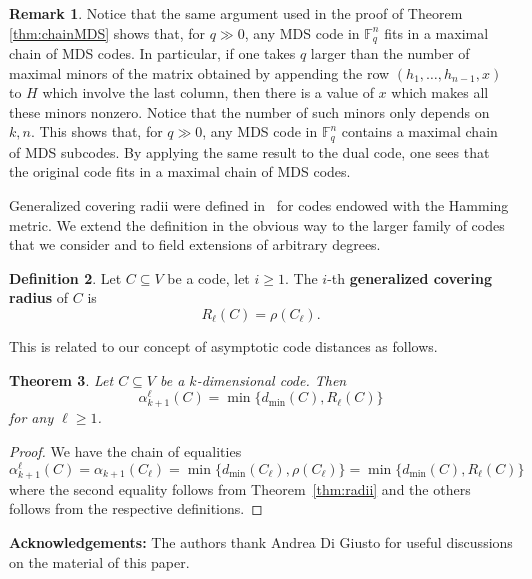 \documentclass[12pt]{amsart}
\numberwithin{equation}{section}
\newtheorem{theorem}{Theorem}[section]
\theoremstyle{definition}
\newtheorem{definition}[theorem]{Definition}
\newtheorem{remark}[theorem]{Remark}
\newcommand{\FF}{\mathbb{F}}
\begin{document}
\begin{remark}
Notice that the same argument used in the proof of Theorem \ref{thm:chainMDS} shows that, for $q\gg 0$, any MDS code in $\FF_q^n$ fits in a maximal chain of MDS codes. In particular, if one takes $q$ larger than the number of maximal minors of the matrix obtained by appending the row $(h_1,\ldots,h_{n-1},x)$ to $H$ which involve the last column, then there is a value of $x$ which makes all these minors nonzero. Notice that the number of such minors only depends on $k,n$. This shows that, for $q\gg 0$, any MDS code in $\FF_q^n$ contains a maximal chain of MDS subcodes. By applying the same result to the dual code, one sees that the original code fits in a maximal chain of MDS codes. 
\end{remark}

Generalized covering radii were defined in~\cite[Definition 8]{EFS21} for codes endowed with the Hamming metric. We extend the definition in the obvious way to the larger family of codes that we consider and to field extensions of arbitrary degrees.

\begin{definition}\label{def:gencovrad}
Let $C\subseteq V$ be a code, let $i\geq 1$. The $i$-th {\bf generalized covering radius} of $C$ is 
$$R_\ell(C)=\rho(C_\ell).$$
\end{definition}

This is related to our concept of asymptotic code distances as follows.

\begin{theorem}\label{thm:genradii}
Let $C\subseteq V$ be a $k$-dimensional code. Then 
$$\alpha_{k+1}^\ell(C)=\min\{d_{\min}(C),R_\ell(C)\}$$
for any $\ell\geq 1$.
\end{theorem}

\begin{proof}
We have the chain of equalities
$$\alpha_{k+1}^\ell(C)=\alpha_{k+1}(C_\ell)=\min\{d_{\min}(C_\ell),\rho(C_\ell)\}=\min\{d_{\min}(C),R_\ell(C)\}$$
where the second equality follows from Theorem~\ref{thm:radii} and the others follows from the respective definitions.
\end{proof}

{\bf Acknowledgements:} The authors thank Andrea Di Giusto for useful discussions on the material of this paper.
\end{document}
